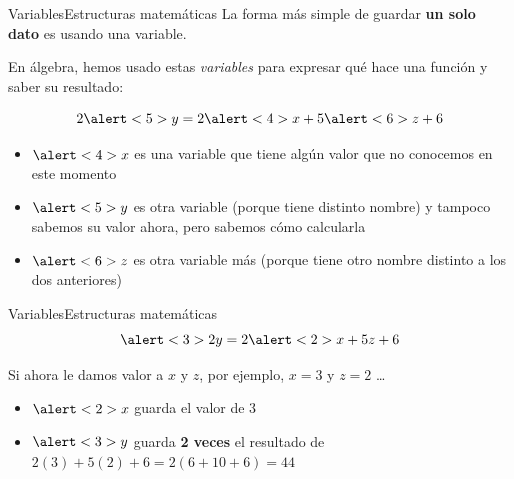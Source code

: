 \documentclass[spanish, c]{beamer}
\begin{document}
\begin{frame}{Variables}{Estructuras matemáticas}
    La forma más simple de guardar \textbf{un solo dato} es usando una \alert{variable}. \pause

    En álgebra, hemos usado estas \textit{variables} para expresar qué hace una función y saber su resultado: \pause

    $$2\alert<5>{y} = 2\alert<4>{x} + 5\alert<6>{z} + 6$$ \pause

    \begin{itemize}
        \item $\alert<4>{x}$ es una variable que tiene algún valor que no conocemos en este momento
        \item $\alert<5>{y}$ es otra variable (porque tiene distinto nombre) y tampoco sabemos su valor ahora, pero sabemos cómo calcularla
        \item $\alert<6>{z}$ es otra variable más (porque tiene otro nombre distinto a los dos anteriores)
    \end{itemize}

\end{frame}

\begin{frame}[t]{Variables}{Estructuras matemáticas}    
    $$\alert<3>{2y} = 2\alert<2>{x} + 5{z} + 6$$

    \bigskip

    Si ahora le damos valor a $x$ y $z$, por ejemplo, $x = 3$ y $z = 2$ \dots \pause

    \bigskip

    \begin{itemize}
        \itemsep1.7ex
        \item $\alert<2>{x}$ guarda el valor de $3$
        \item $\alert<3>{y}$ guarda \textbf{2 veces} el resultado de $2(3) + 5(2) + 6 = 2(6+10+6) = 44$
    \end{itemize}

\end{frame}
\end{document}
